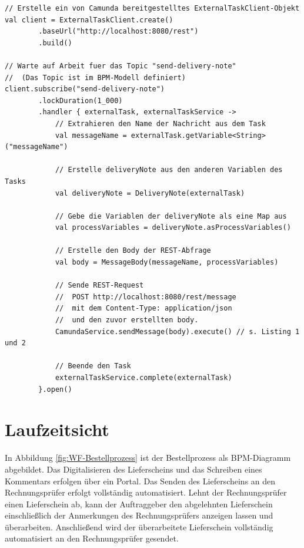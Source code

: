 \begin{lstlisting}[caption={Beispielimplementierung eines externen Tasks},label=list:beispieltask]
// Erstelle ein von Camunda bereitgestelltes ExternalTaskClient-Objekt
val client = ExternalTaskClient.create()
        .baseUrl("http://localhost:8080/rest")
        .build()

// Warte auf Arbeit fuer das Topic "send-delivery-note"
//  (Das Topic ist im BPM-Modell definiert)
client.subscribe("send-delivery-note")
        .lockDuration(1_000)
        .handler { externalTask, externalTaskService ->
            // Extrahieren den Name der Nachricht aus dem Task
            val messageName = externalTask.getVariable<String>("messageName")

            // Erstelle deliveryNote aus den anderen Variablen des Tasks
            val deliveryNote = DeliveryNote(externalTask)

            // Gebe die Variablen der deliveryNote als eine Map aus
            val processVariables = deliveryNote.asProcessVariables()

            // Erstelle den Body der REST-Abfrage
            val body = MessageBody(messageName, processVariables)

            // Sende REST-Request
            //  POST http://localhost:8080/rest/message
            //  mit dem Content-Type: application/json
            //  und den zuvor erstellten body.
            CamundaService.sendMessage(body).execute() // s. Listing 1 und 2

            // Beende den Task
            externalTaskService.complete(externalTask)
        }.open()
\end{lstlisting}

\section{Laufzeitsicht}\label{section-runtime-view}

In Abbildung \ref{fig:WF-Bestellprozess} ist der Bestellprozess als BPM-Diagramm abgebildet. Das Digitalisieren des Lieferscheins und das Schreiben eines Kommentars erfolgen über ein Portal. Das Senden des Lieferscheins an den Rechnungsprüfer erfolgt vollständig automatisiert. Lehnt der Rechnungsprüfer einen Lieferschein ab, kann der Auftraggeber den abgelehnten Lieferschein einschließlich der Anmerkungen des Rechnungsprüfers anzeigen lassen und überarbeiten. Anschließend wird der überarbeitete Lieferschein vollständig automatisiert an den Rechnungsprüfer gesendet.

